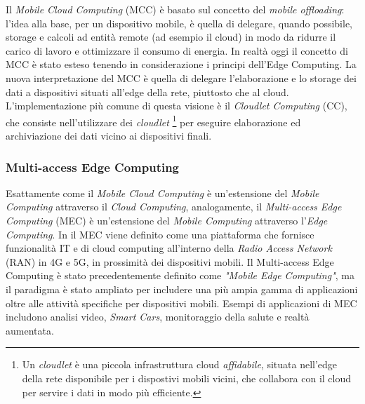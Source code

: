 Il \textit{Mobile Cloud Computing} (MCC) è basato sul concetto del \textit{mobile offloading}: l'idea alla base, per un dispositivo mobile, è quella di delegare, quando possibile, storage e calcoli ad entità remote (ad esempio il cloud) in modo da ridurre il carico di lavoro e ottimizzare il consumo di energia. In realtà oggi il concetto di MCC è stato esteso tenendo in considerazione i principi dell'Edge Computing. La nuova interpretazione del MCC è quella di delegare l'elaborazione e lo storage dei dati a dispositivi situati all'edge della rete, piuttosto che al cloud. L'implementazione più comune di questa visione è il \textit{Cloudlet Computing} (CC), che consiste nell'utilizzare dei \textit{cloudlet} \footnote{Un \textit{cloudlet} è una piccola infrastruttura cloud \textit{affidabile}, situata nell'edge della rete disponibile per i dispostivi mobili vicini, che collabora con il cloud per servire i dati in modo più efficiente.} per eseguire elaborazione ed archiviazione dei dati vicino ai dispositivi finali.

\subsubsection{Multi-access Edge Computing}

Esattamente come il \textit{Mobile Cloud Computing} è un'estensione del \textit{Mobile Computing} attraverso il \textit{Cloud Computing}, analogamente, il \textit{Multi-access Edge Computing} (MEC) è un'estensione del \textit{Mobile Computing} attraverso l'\textit{Edge Computing}. In \cite{MultiAccessEdgeComputing} il MEC viene definito come una piattaforma che fornisce funzionalità IT e di cloud computing all'interno della \textit{Radio Access Network} (RAN) in 4G e 5G, in prossimità dei dispositivi mobili. Il Multi-access Edge Computing è stato precedentemente definito come \textit{"Mobile Edge Computing"}, ma il paradigma è stato ampliato per includere una più ampia gamma di applicazioni oltre alle attività specifiche per dispositivi mobili. Esempi di applicazioni di MEC includono analisi video, \textit{Smart Cars}, monitoraggio della salute e realtà aumentata.


